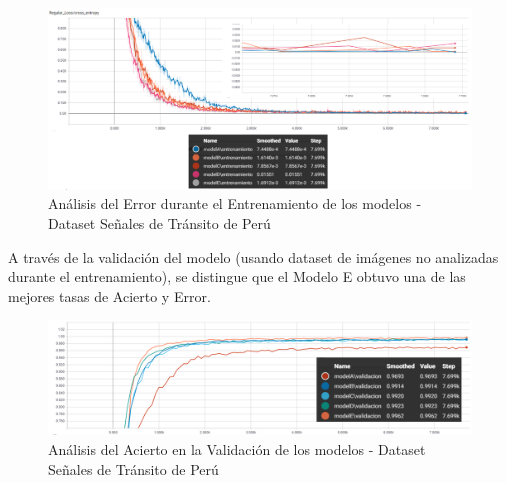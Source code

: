 			\begin{figure}[H]
				\includegraphics[width=1\textwidth, height=\textheight,keepaspectratio]{images/desarrollo/trainResults/peruSummary_entreError} 
				\begin{center}
				\caption{\small{Análisis del Error durante el Entrenamiento de los modelos - Dataset Señales de Tránsito de Perú}}
				
				{\small{\fontsize{10}{16.8}\selectfont {Fuente: Elaboración propia}}}
				\end{center}
				\vspace{-1.5em}
			\end{figure}	


			A través de la validación del modelo (usando dataset de imágenes no analizadas durante el entrenamiento), se distingue que el Modelo E obtuvo una de las mejores tasas de Acierto y Error. 

			\begin{figure}[H]
				\includegraphics[width=1\textwidth, height=\textheight,keepaspectratio]{images/desarrollo/trainResults/peruSummary_validAcierto} 
				\begin{center}
				\caption{\small{Análisis del Acierto en la Validación de los modelos - Dataset Señales de Tránsito de Perú}}
				
				{\small{\fontsize{10}{16.8}\selectfont {Fuente: Elaboración propia}}}
				\end{center}
				\vspace{-1.5em}
			\end{figure}

